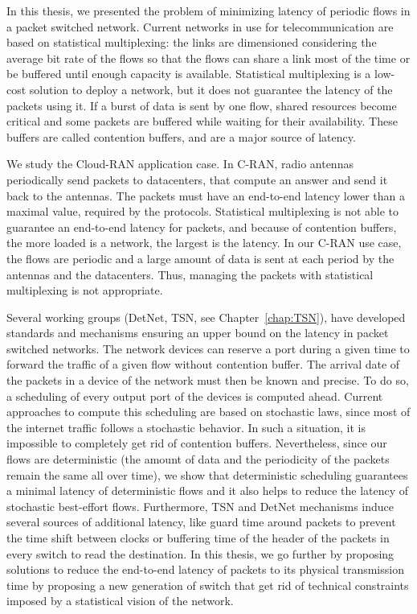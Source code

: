 
\label{chap:concl}

In this thesis, we presented the problem of minimizing latency of periodic flows in a packet switched network. Current networks in use for telecommunication are based on statistical multiplexing: the links are dimensioned considering the average bit rate of the flows so that the flows can share a link most of the time or be buffered until enough capacity is available. Statistical multiplexing is a low-cost solution to deploy a network, but it does not guarantee the latency of the packets using it. If a burst of data is sent by one flow, shared resources become critical and some packets are buffered while waiting for their availability. These buffers are called contention buffers, and are a major source of latency.

We study the Cloud-RAN application case. In C-RAN, radio antennas periodically send packets to datacenters, that compute an answer and send it back to the antennas. The packets must have an end-to-end latency lower than a maximal value, required by the protocols. Statistical multiplexing is not able to guarantee an end-to-end latency for packets, and because of contention buffers, the more loaded is a network, the largest is the latency. In our C-RAN use case, the flows are periodic and a large amount of data is sent at each period by the antennas and the datacenters. Thus, managing the packets with statistical multiplexing is not appropriate.

Several working groups (DetNet, TSN, see Chapter~\ref{chap:TSN}), have developed standards and mechanisms ensuring an upper bound on the latency in packet switched networks. The network devices can reserve a port during a given time to forward the traffic of a given flow without contention buffer. The arrival date of the packets in a device of the network must then be known and precise. To do so, a scheduling of every output port of the devices is computed ahead. Current approaches to compute this scheduling are based on stochastic laws, since most of the internet traffic follows a stochastic behavior. In such a situation, it is impossible to completely get rid of contention buffers. Nevertheless, since our flows are deterministic (the amount of data and the periodicity of the packets remain the same all over time), we show that deterministic scheduling guarantees a minimal latency of deterministic flows and it also helps to reduce the latency of stochastic best-effort flows. 
Furthermore, TSN and DetNet mechanisms induce several sources of additional latency, like guard time around packets to prevent the time shift between clocks or buffering time of the header of the packets in every switch to read the destination. In this thesis, we go further by proposing solutions to reduce the end-to-end latency of packets to its physical transmission time by proposing a new generation of switch that get rid of technical constraints imposed by a statistical vision of the network.


